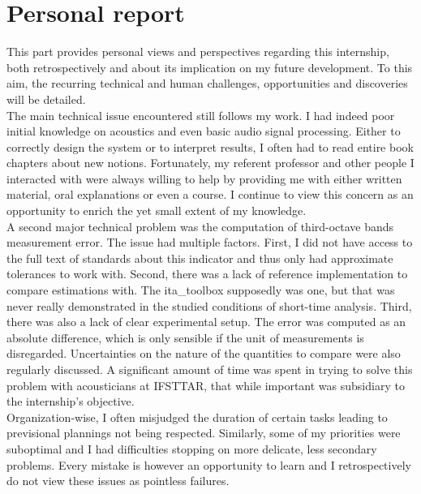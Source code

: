 \documentclass[12pt,times,onecolumn]{article}
\begin{document}
\clearpage
\part{Personal report}

This part provides personal views and perspectives regarding this internship, both retrospectively and about its implication on my future development. To this aim, the recurring technical and human challenges, opportunities and discoveries will be detailed.\\

The main technical issue encountered still follows my work. I had indeed poor initial knowledge on acoustics and even basic audio signal processing. Either to correctly design the system or to interpret results, I often had to read entire book chapters about new notions. Fortunately, my referent professor and other people I interacted with were always willing to help by providing me with either written material, oral explanations or even a course. I continue to view this concern as an opportunity to enrich the yet small extent of my knowledge.\\

A second major technical problem was the computation of third-octave bands measurement error. The issue had multiple factors. First, I did not have access to the full text of standards about this indicator and thus only had approximate tolerances to work with. Second, there was a lack of reference implementation to compare estimations with. The ita\_toolbox supposedly was one, but that was never really demonstrated in the studied conditions of short-time analysis. Third, there was also a lack of clear experimental setup. The error was computed as an absolute difference, which is only sensible if the unit of measurements is disregarded. Uncertainties on the nature of the quantities to compare were also regularly discussed. A significant amount of time was spent in trying to solve this problem with acousticians at IFSTTAR, that while important was subsidiary to the internship's objective.\\

Organization-wise, I often misjudged the duration of certain tasks leading to previsional plannings not being respected. Similarly, some of my priorities were suboptimal and I had difficulties stopping on more delicate, less secondary problems. Every mistake is however an opportunity to learn and I retrospectively do not view these issues as pointless failures.\\
\end{document}
